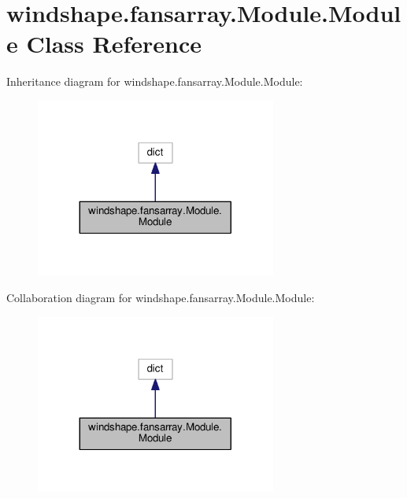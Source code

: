 \hypertarget{classwindshape_1_1fansarray_1_1_module_1_1_module}{}\section{windshape.\+fansarray.\+Module.\+Module Class Reference}
\label{classwindshape_1_1fansarray_1_1_module_1_1_module}


Inheritance diagram for windshape.\+fansarray.\+Module.\+Module\+:\nopagebreak
\begin{figure}[H]
\begin{center}
\leavevmode
\includegraphics[width=224pt]{classwindshape_1_1fansarray_1_1_module_1_1_module__inherit__graph}
\end{center}
\end{figure}


Collaboration diagram for windshape.\+fansarray.\+Module.\+Module\+:\nopagebreak
\begin{figure}[H]
\begin{center}
\leavevmode
\includegraphics[width=224pt]{classwindshape_1_1fansarray_1_1_module_1_1_module__coll__graph}
\end{center}
\end{figure}
